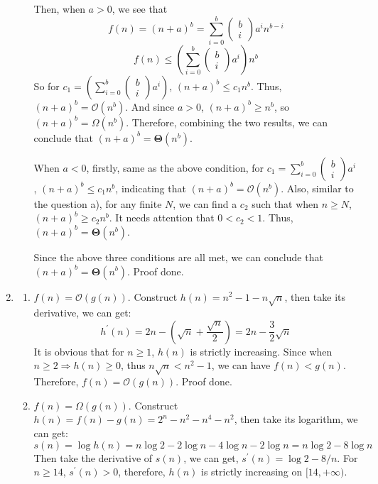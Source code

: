 \documentclass[12pt, a4paper]{article}
\begin{document}
\begin{enumerate}
\begin{enumerate}[a)]
              Then, when $a > 0$, we see that 
              $$f(n) = (n + a)^b = \sum_{i=0}^b \begin{pmatrix} b\\i \end{pmatrix}a^i n^{b-i}$$  
              $$f(n) \leq (\sum_{i=0}^b \begin{pmatrix} b\\i \end{pmatrix}a^i) n^b$$
              So for $c_1 = (\sum_{i=0}^b \begin{pmatrix} b\\i \end{pmatrix}a^i)$, 
              $(n + a)^b \leq c_1 n^b$. Thus, $(n + a)^b = \mathcal{O}(n^b)$. And since $a > 0$, $(n + a)^b \geq n^b$, 
              so $(n+a)^b = \Omega(n^b)$. Therefore, combining the two results, we can conclude that $(n + a)^b = \boldsymbol{\Theta}(n^b)$.

              When $a < 0$, firstly, same as the above condition, for $c_1 = \sum_{i=0}^b \begin{pmatrix} b\\i \end{pmatrix}a^i$, 
              $(n + a)^b \leq c_1 n^b$, indicating that $(n + a)^b = \mathcal{O}(n^b)$. Also, similar to the question a), 
              for any finite $N$, we can find a $c_2$ such that when $n \geq N$, $(n + a)^b \geq c_2 n^b$. 
              It needs attention that $0 < c_2 < 1$. Thus, $(n + a)^b = \boldsymbol{\Theta}(n^b)$.

              Since the above three conditions are all met, we can conclude that $(n + a)^b = \boldsymbol{\Theta}(n^b)$. Proof done.
    \end{enumerate}

    \item \begin{enumerate}
        \item $f(n) = \mathcal{O}(g(n))$. Construct $h(n) = n^2 - 1 - n\sqrt{n}$, then take its derivative, we can get:
              $$h^\prime(n) = 2n - (\sqrt{n} + \frac{\sqrt{n}}{2}) = 2n - \frac{3}{2}\sqrt{n}$$
              It is obvious that for $n \geq 1$, $h(n)$ is strictly increasing. 
              Since when $n \geq 2 \Rightarrow h(n) \geq 0$, thus $n\sqrt{n} < n^2 - 1$, we can have $f(n) < g(n)$. 
              Therefore, $f(n) = \mathcal{O}(g(n))$. Proof done.
        
        \item $f(n) = \Omega(g(n))$. Construct $h(n) = f(n) - g(n) = 2^n - n^2 - n^4 - n^2$, then take its logarithm, we can get:
              $$s(n) = \log h(n) = n\log 2 - 2\log n - 4\log n - 2\log n = n\log2 - 8\log n$$
              Then take the derivative of $s(n)$, we can get, $s^\prime(n) = \log 2 - 8 / n$. For $n \geq 14$, 
              $s^\prime(n) > 0$, therefore, $h(n)$ is strictly increasing on $[14, +\infty)$. 
              

\end{enumerate}
\end{enumerate}
\end{document}
